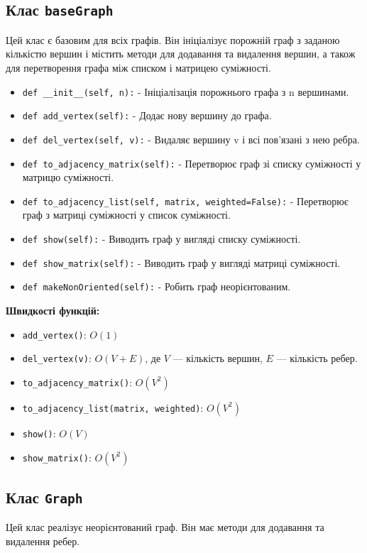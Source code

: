 \documentclass{article}
\begin{document}
\subsection{Клас \texttt{baseGraph}}
Цей клас є базовим для всіх графів. Він ініціалізує порожній граф з заданою кількістю вершин і містить методи для додавання та видалення вершин, а також для перетворення графа між списком і матрицею суміжності.
\begin{itemize}
    \item \texttt{def \_\_init\_\_(self, n):} - Ініціалізація порожнього графа з n вершинами.
    \item \texttt{def add\_vertex(self):} - Додає нову вершину до графа.
    \item \texttt{def del\_vertex(self, v):} - Видаляє вершину v і всі пов'язані з нею ребра.
    \item \texttt{def to\_adjacency\_matrix(self):} - Перетворює граф зі списку суміжності у матрицю суміжності.
    \item \texttt{def to\_adjacency\_list(self, matrix, weighted=False):} - Перетворює граф з матриці суміжності у список суміжності.
    \item \texttt{def show(self):} - Виводить граф у вигляді списку суміжності.
    \item \texttt{def show\_matrix(self):} - Виводить граф у вигляді матриці суміжності.
    \item \texttt{def makeNonOriented(self):} - Робить граф неорієнтованим.
\end{itemize}


\textbf{Швидкості функцій:}
\begin{itemize}
    \item \texttt{add\_vertex()}: $O(1)$
    \item \texttt{del\_vertex(v)}: $O(V + E)$, де $V$ — кількість вершин, $E$ — кількість ребер.
    \item \texttt{to\_adjacency\_matrix()}: $O(V^2)$
    \item \texttt{to\_adjacency\_list(matrix, weighted)}: $O(V^2)$
    \item \texttt{show()}: $O(V)$
    \item \texttt{show\_matrix()}: $O(V^2)$
\end{itemize}

\subsection{Клас \texttt{Graph}}
Цей клас реалізує неорієнтований граф. Він має методи для додавання та видалення ребер.
\end{document}
